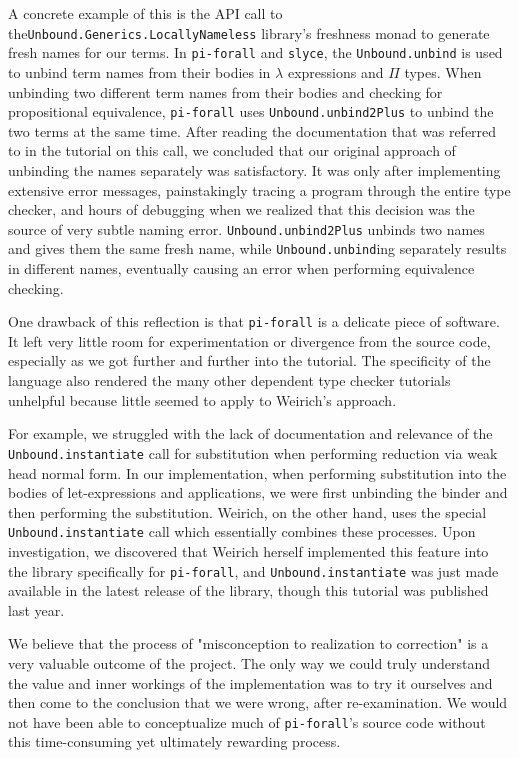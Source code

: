 A concrete example of this is the API call to the\newline \texttt{Unbound.Generics.LocallyNameless} library's freshness monad to generate fresh names for our terms. 
In \texttt{pi-forall} and \texttt{slyce}, the \texttt{Unbound.unbind} is used to unbind term names from their bodies in $\lambda$ expressions and $\Pi$ types.
When unbinding two different term names from their bodies and checking for propositional equivalence, \texttt{pi-forall} uses \texttt{Unbound.unbind2Plus} to unbind the two terms at the same time. 
After reading the documentation that was referred to in the tutorial on this call, we concluded that our original approach of unbinding the names separately was satisfactory. 
It was only after implementing extensive error messages, painstakingly tracing a program through the entire type checker, and hours of debugging when we realized that this decision was the source of very subtle naming error.
\texttt{Unbound.unbind2Plus} unbinds two names and gives them the same fresh name, while \texttt{Unbound.unbind}ing separately results in different names, eventually causing an error when performing equivalence checking.


One drawback of this reflection is that \texttt{pi-forall} is a delicate piece of software. 
It left very little room for experimentation or divergence from the source code, especially as we got further and further into the tutorial.
The specificity of the language also rendered the many other dependent type checker tutorials unhelpful because little seemed to apply to Weirich's approach.

For example, we struggled with the lack of documentation and relevance of the \texttt{Unbound.instantiate} call for substitution when performing reduction via weak head normal form.
In our implementation, when performing substitution into the bodies of let-expressions and applications, we were first unbinding the binder and then performing the substitution. 
Weirich, on the other hand, uses the special \texttt{Unbound.instantiate} call which essentially combines these processes. 
Upon investigation, we discovered that Weirich herself implemented this feature into the library specifically for \texttt{pi-forall}, and \texttt{Unbound.instantiate} was just made available in the latest release of the library, though this tutorial was published last year.

We believe that the process of "misconception to realization to correction" is a very valuable outcome of the project. 
The only way we could truly understand the value and inner workings of the implementation was to try it ourselves and then come to the conclusion that we were wrong, after re-examination.
We would not have been able to conceptualize much of \texttt{pi-forall}'s source code without this time-consuming yet ultimately rewarding process.






